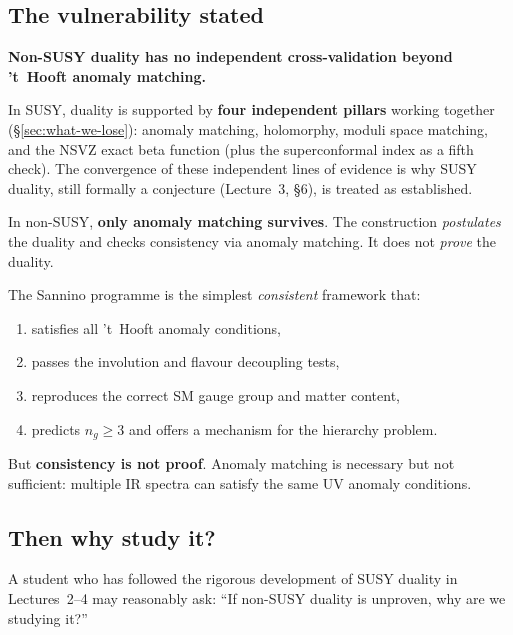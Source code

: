 \documentclass[11pt,a4paper]{article}
\begin{document}
\subsection{The vulnerability stated}

\begin{warningbox}[title={Central vulnerability of non-SUSY duality}]
  \textbf{Non-SUSY duality has no independent cross-validation
  beyond 't~Hooft anomaly matching.}

  \medskip

  In SUSY, duality is supported by \textbf{four independent
  pillars} working together (\S\ref{sec:what-we-lose}):
  anomaly matching, holomorphy, moduli space matching, and the NSVZ
  exact beta function (plus the superconformal index as a fifth check).
  The convergence of these independent lines of evidence is why SUSY
  duality, still formally a conjecture (Lecture~3, \S6), is treated as
  established.

  \medskip

  In non-SUSY, \textbf{only anomaly matching survives}.  The
  construction \emph{postulates} the duality and checks consistency
  via anomaly matching.  It does not \emph{prove} the duality.

  \medskip

  The Sannino programme is the simplest \emph{consistent} framework
  that:
  \begin{enumerate}[label=(\roman*)]
    \item satisfies all 't~Hooft anomaly conditions,
    \item passes the involution and flavour decoupling tests,
    \item reproduces the correct SM gauge group and matter content,
    \item predicts $n_g \geq 3$ and offers a mechanism for the
      hierarchy problem.
  \end{enumerate}
  But \textbf{consistency is not proof}.  Anomaly matching is
  necessary but not sufficient: multiple IR spectra can satisfy the
  same UV anomaly conditions.
\end{warningbox}

\subsection{Then why study it?}

A student who has followed the rigorous development of SUSY duality
in Lectures~2--4 may reasonably ask: ``If non-SUSY duality is
unproven, why are we studying it?''
\end{document}

